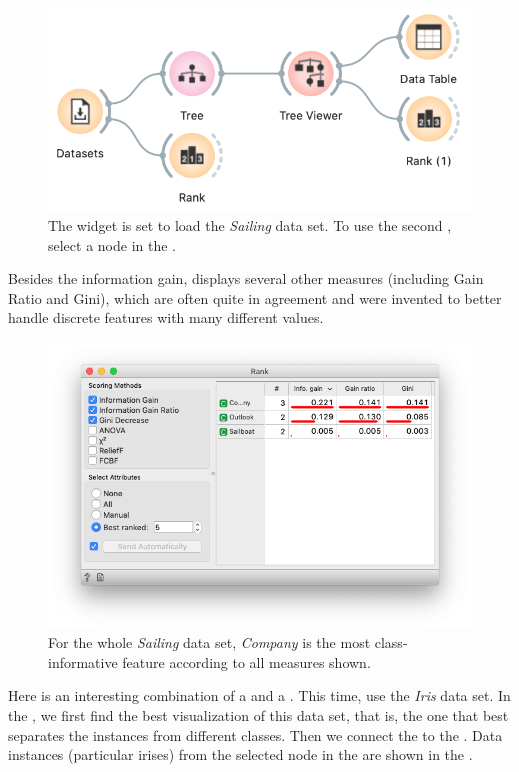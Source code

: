 \begin{figure}[h]
    \centering
    \includegraphics[scale=0.4]{workflow-rank.png}
    \caption{The  widget is set to load the \textit{Sailing} data set. To use the second , select a node in the .}
\end{figure}

Besides the information gain,  displays several other measures (including Gain Ratio and Gini), which are often quite in agreement and were invented to better handle discrete features with many different values.

\begin{figure}[h]
    \centering
    \vspace{-0.2cm}
    \includegraphics[scale=0.4]{rank.png}
    \caption{For the whole \textit{Sailing} data set, \textit{Company} is the most class-informative feature according to all measures shown.}
\end{figure}

\newpage

Here is an interesting combination of a  and a . This time, use the \textit{Iris} data set. In the , we first find the best visualization of this data set, that is, the one that best separates the instances from different classes. Then we connect the  to the . Data instances (particular irises) from the selected node in the  are shown in the .


